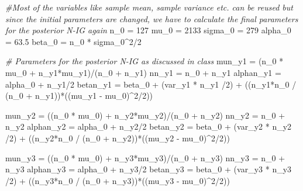 \documentclass[]{article}
\newenvironment{Shaded}{\begin{snugshade}}{\end{snugshade}}
\newcommand{\DecValTok}[1]{\textcolor[rgb]{0.00,0.00,0.81}{{#1}}}
\newcommand{\FloatTok}[1]{\textcolor[rgb]{0.00,0.00,0.81}{{#1}}}
\newcommand{\StringTok}[1]{\textcolor[rgb]{0.31,0.60,0.02}{{#1}}}
\newcommand{\CommentTok}[1]{\textcolor[rgb]{0.56,0.35,0.01}{\textit{{#1}}}}
\newcommand{\NormalTok}[1]{{#1}}
\begin{document}
\begin{Shaded}
\begin{Highlighting}[]
\CommentTok{#Most of the variables like sample mean, sample variance etc. can be reused but since the initial parameters are changed, we have to calculate the final parameters for the posterior N-IG again}
\NormalTok{n_0 =}\StringTok{ }\DecValTok{127}
\NormalTok{mu_0 =}\StringTok{ }\DecValTok{2133}
\NormalTok{sigma_0 =}\StringTok{ }\DecValTok{279}
\NormalTok{alpha_0 =}\StringTok{ }\FloatTok{63.5}
\NormalTok{beta_0 =}\StringTok{ }\NormalTok{n_0 *}\StringTok{ }\NormalTok{sigma_0^}\DecValTok{2}\NormalTok{/}\DecValTok{2}

\CommentTok{# Parameters for the posterior N-IG as discussed in class}
\NormalTok{mun_y1 =}\StringTok{ }\NormalTok{(n_0 *}\StringTok{ }\NormalTok{mu_0 +}\StringTok{ }\NormalTok{n_y1*mu_y1)/(n_0 +}\StringTok{ }\NormalTok{n_y1)}
\NormalTok{nn_y1 =}\StringTok{ }\NormalTok{n_0 +}\StringTok{ }\NormalTok{n_y1}
\NormalTok{alphan_y1 =}\StringTok{ }\NormalTok{alpha_0 +}\StringTok{ }\NormalTok{n_y1/}\DecValTok{2}
\NormalTok{betan_y1 =}\StringTok{ }\NormalTok{beta_0 +}\StringTok{ }\NormalTok{(var_y1 *}\StringTok{ }\NormalTok{n_y1 /}\DecValTok{2}\NormalTok{) +}\StringTok{ }\NormalTok{((n_y1*n_0 /}\StringTok{ }\NormalTok{(n_0 +}\StringTok{ }\NormalTok{n_y1))*((mu_y1 -}\StringTok{ }\NormalTok{mu_0)^}\DecValTok{2}\NormalTok{/}\DecValTok{2}\NormalTok{))}

\NormalTok{mun_y2 =}\StringTok{ }\NormalTok{((n_0 *}\StringTok{ }\NormalTok{mu_0) +}\StringTok{ }\NormalTok{n_y2*mu_y2)/(n_0 +}\StringTok{ }\NormalTok{n_y2)}
\NormalTok{nn_y2 =}\StringTok{ }\NormalTok{n_0 +}\StringTok{ }\NormalTok{n_y2}
\NormalTok{alphan_y2 =}\StringTok{ }\NormalTok{alpha_0 +}\StringTok{ }\NormalTok{n_y2/}\DecValTok{2}
\NormalTok{betan_y2 =}\StringTok{ }\NormalTok{beta_0 +}\StringTok{ }\NormalTok{(var_y2 *}\StringTok{ }\NormalTok{n_y2 /}\DecValTok{2}\NormalTok{) +}\StringTok{ }\NormalTok{((n_y2*n_0 /}\StringTok{ }\NormalTok{(n_0 +}\StringTok{ }\NormalTok{n_y2))*((mu_y2 -}\StringTok{ }\NormalTok{mu_0)^}\DecValTok{2}\NormalTok{/}\DecValTok{2}\NormalTok{))}

\NormalTok{mun_y3 =}\StringTok{ }\NormalTok{((n_0 *}\StringTok{ }\NormalTok{mu_0) +}\StringTok{ }\NormalTok{n_y3*mu_y3)/(n_0 +}\StringTok{ }\NormalTok{n_y3)}
\NormalTok{nn_y3 =}\StringTok{ }\NormalTok{n_0 +}\StringTok{ }\NormalTok{n_y3}
\NormalTok{alphan_y3 =}\StringTok{ }\NormalTok{alpha_0 +}\StringTok{ }\NormalTok{n_y3/}\DecValTok{2}
\NormalTok{betan_y3 =}\StringTok{ }\NormalTok{beta_0 +}\StringTok{ }\NormalTok{(var_y3 *}\StringTok{ }\NormalTok{n_y3 /}\DecValTok{2}\NormalTok{) +}\StringTok{ }\NormalTok{((n_y3*n_0 /}\StringTok{ }\NormalTok{(n_0 +}\StringTok{ }\NormalTok{n_y3))*((mu_y3 -}\StringTok{ }\NormalTok{mu_0)^}\DecValTok{2}\NormalTok{/}\DecValTok{2}\NormalTok{))}
\end{Highlighting}
\end{Shaded}
\end{document}
